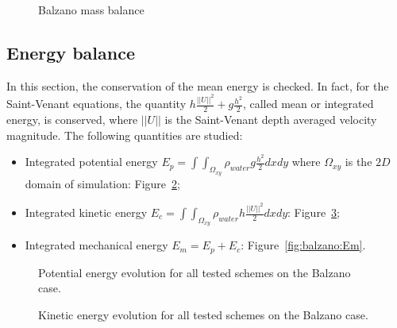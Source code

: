 \begin{figure}[h!]
  \centering
  \caption{Balzano mass balance}\label{fig:balzano:massbalance}
\end{figure}

\subsection{Energy balance}

In this section, the conservation of the mean energy is checked. In fact, for the Saint-Venant equations,
the quantity $h \frac{||U||^2}{2} + g \frac{h^2}{2}$, called mean or integrated energy, is conserved,
where $||U||$ is the Saint-Venant depth averaged velocity magnitude.
The following quantities are studied:
\begin{itemize}
\item Integrated potential energy \textbf{$E_p =\int\int_{\Omega_{xy}}\rho_{water} g \frac{h^2}{2} dxdy$} where $\Omega_{xy}$ is the $2D$ domain of simulation: Figure~\ref{fig:balzano:Ep};
\item Integrated kinetic energy \textbf{$E_c =\int\int_{\Omega_{xy}} \rho_{water} h \frac{||U||^2}{2} dxdy$}: Figure~\ref{fig:balzano:Ec};
\item Integrated mechanical energy \textbf{$E_m = E_p + E_c$}: Figure~\ref{fig:balzano:Em}.
\end{itemize}

\begin{figure}[H]
  \centering
  \caption{Potential energy evolution for all tested schemes on the Balzano case.}
\label{fig:balzano:Ep}
\end{figure}

\begin{figure}[H]
  \centering
  \caption{Kinetic energy evolution for all tested schemes on the Balzano case.}
\label{fig:balzano:Ec}
\end{figure}

